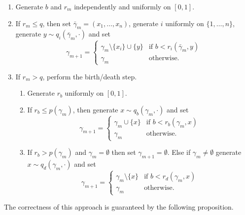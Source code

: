 \begin{enumerate} 
	\item Generate $b$ and $r_m$ independently and uniformly on $[0,1]$.
	\item If $r_m \leq q$, then set $\bar\gamma_m=(x_1,\dots, x_n)$, generate $i$ uniformly on $\{1,\dots, n\}$, generate $y \sim q_i(\bar \gamma_m,\cdot)$ and set 
		\begin{equation}
		\gamma_{m+1} = 
		\left\{
		    \begin{array}{ll}
			\gamma_m \setminus\{x_i\}\cup \{y\} & \mbox{if }  b < r_i(\bar\gamma_m,y)\\ 
			\gamma_m & \mbox{otherwise. }
		    \end{array}
		\right. 
		\end{equation}
	\item If $r_m > q$, perform the birth/death step. 
	\begin{enumerate}
		\item Generate $r_{b}$ uniformly on $[0,1]$.
		    \item If $r_{b}\leq p(\gamma_m)$, then generate $x\sim q_b(\gamma_m,\cdot)$ and set
			\begin{equation}
			\gamma_{m+1} = 
			\left\{
			    \begin{array}{ll}
				\gamma_m \cup \{x\} & \mbox{if }  b < r_b(\gamma_m, x) \\
				\gamma_m & \mbox{otherwise. }
			    \end{array}
			\right. 
			\end{equation}
		    \item If $r_{b}>p(\gamma_m)$ and $\gamma_m=\emptyset$ then set $\gamma_{m+1}=\emptyset$. Else if $\gamma_m\neq\emptyset$ generate $x\sim q_d(\gamma_m,\cdot)$ and set
			\begin{equation}
			\gamma_{m+1} = 
			\left\{
			    \begin{array}{ll}
				\gamma_m \setminus \{x\} & \mbox{if }  b < r_d(\gamma_m, x) \\ 
				\gamma_m & \mbox{otherwise. }
			    \end{array}
			\right. 
			\end{equation}
	\end{enumerate}
\end{enumerate}

\noindent The correctness of this approach is guaranteed by the following proposition.


